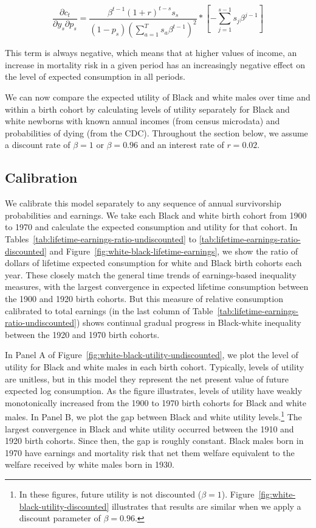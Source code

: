 \documentclass[12pt]{article}
\begin{document}
\[\frac{\partial c_t}{\partial y_s \partial p_s}= \frac{\beta^{t-1} (1+r)^{t-s} s_s}{(1-p_s)\left(\sum\limits_{a=1}^T s_a\beta^{t-1}\right)^2}*\left[-\sum\limits_{j=1}^{s-1} s_j\beta^{j-1} \right] \]

\noindent This term is always negative, which means that at higher values of income, an increase in mortality risk in a given period has an increasingly negative effect on the level of expected consumption in all periods.

We can now compare the expected utility of Black and white males over time and within a birth cohort by calculating levels of utility separately for Black and white newborns with known annual incomes (from census microdata) and probabilities of dying (from the CDC).
Throughout the section below, we assume a discount rate of $\beta = 1$ or $\beta = 0.96$ and an interest rate of $r = 0.02$.

\subsection{Calibration\label{sec:calibration}}

We calibrate this model separately to any sequence of annual survivorship probabilities and earnings. 
We take each Black and white birth cohort from 1900 to 1970 and calculate the expected consumption and utility for that cohort. 
In Tables~\ref{tab:lifetime-earnings-ratio-undiscounted} to \ref{tab:lifetime-earnings-ratio-discounted} and Figure~\ref{fig:white-black-lifetime-earnings}, we show the ratio of dollars of lifetime expected consumption for white and Black birth cohorts each year. 
These closely match the general time trends of earnings-based inequality measures, with the largest convergence in expected lifetime consumption between the 1900 and 1920 birth cohorts. 
But this measure of relative consumption calibrated to total earnings (in the last column of Table~\ref{tab:lifetime-earnings-ratio-undiscounted}) shows continual gradual progress in Black-white inequality between the 1920 and 1970 birth cohorts.

In Panel A of Figure~\ref{fig:white-black-utility-undiscounted}, we plot the level of utility for Black and white males in each birth cohort. 
Typically, levels of utility are unitless, but in this model they represent the net present value of future expected log consumption. 
As the figure illustrates, levels of utility have weakly monotonically increased from the 1900 to 1970 birth cohorts for Black and white males. 
In Panel B, we plot the gap between Black and white utility levels.\footnote{ 
    In these figures, future utility is not discounted ($\beta = 1$). 
    Figure~\ref{fig:white-black-utility-discounted} illustrates that results are similar when we apply a discount parameter of $\beta = 0.96$.
} 
The largest convergence in Black and white utility occurred between the 1910 and 1920 birth cohorts. 
Since then, the gap is roughly constant. 
Black males born in 1970 have earnings and mortality risk that net them welfare equivalent to the welfare received by white males born in 1930.
\end{document}
